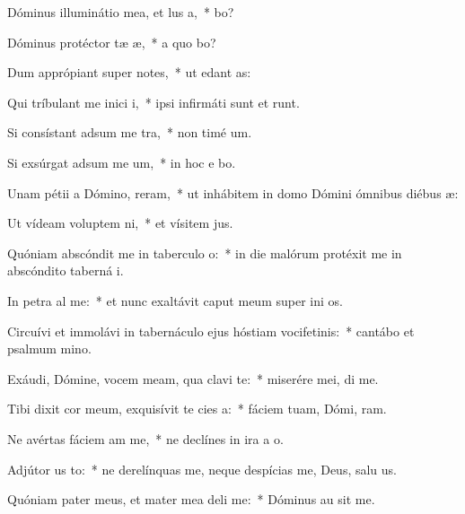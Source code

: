 \item Dóminus illuminátio mea, et lus a,~*  bo?
\item Dóminus protéctor tæ æ,~* a quo bo?
\item Dum apprópiant super  notes,~* ut edant  as:
\item Qui tríbulant me inici i,~* ipsi infirmáti sunt et runt.
\item Si consístant adsum me tra,~* non timé  um.
\item Si exsúrgat adsum me um,~* in hoc e bo.
\item Unam pétii a Dómino,  reram,~* ut inhábitem in domo Dómini ómnibus diébus  æ:
\item Ut vídeam voluptem ni,~* et vísitem  jus.
\item Quóniam abscóndit me in taberculo o:~* in die malórum protéxit me in abscóndito taberná i.
\item In petra al me:~* et nunc exaltávit caput meum super ini os.
\item Circuívi et immolávi in tabernáculo ejus hóstiam vocifetinis:~* cantábo et psalmum  mino.
\item Exáudi, Dómine, vocem meam, qua clavi  te:~* miserére mei,  di me.
\item Tibi dixit cor meum, exquisívit te cies a:~* fáciem tuam, Dómi, ram.
\item Ne avértas fáciem am  me,~* ne declínes in ira a  o.
\item Adjútor us to:~* ne derelínquas me, neque despícias me, Deus, salu us.
\item Quóniam pater meus, et mater mea deli me:~* Dóminus au sit me.
